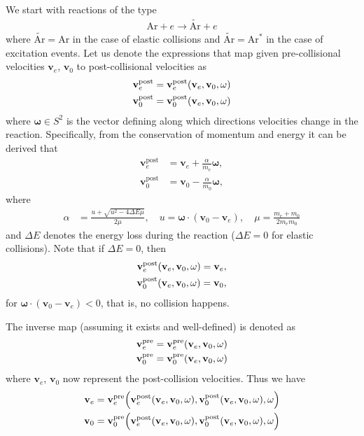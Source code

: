 \documentclass{article}
\newcommand{\vect}[1]{\mathbf{#1}}
\newcommand{\of}[1]{\mleft( #1 \mright)}
\begin{document}
We start with reactions of the type
\begin{align*}
\text{Ar} + e \longrightarrow \tilde{\text{Ar}} + e
\end{align*}
where $\tilde{\text{Ar}} = \text{Ar}$ in the case of elastic collisions and $\tilde{\text{Ar}} = \text{Ar}^\ast$ in the case of excitation events. Let us denote the expressions that map given pre-collisional velocities $\vect{v}_e$, $\vect{v}_0$ to post-collisional velocities as 
\begin{align*}
\vect{v}_e^\text{post} &= \vect{v}_e^\text{post} \of{\vect{v}_e, \vect{v}_0, \vect{\omega}}
\\
\vect{v}_0^\text{post} &= \vect{v}_0^\text{post} \of{\vect{v}_e, \vect{v}_0, \vect{\omega}}
\end{align*} 
where $\vect{\omega} \in S^2$ is the vector defining along which directions velocities change in the reaction. Specifically, from the conservation of momentum and energy it can be derived that
\begin{align*}
\vect{v}_e^\text{post} &= \vect{v}_e + \frac{\alpha}{m_e}\vect{\omega},
\\
\vect{v}_0^\text{post} &= \vect{v}_0 - \frac{\alpha}{m_0}\vect{\omega},
\end{align*}
where
\begin{align*}
\alpha &= \frac{u + \sqrt{u^2 - 4 \Delta E \mu}}{2\mu},
\quad 
u = \vect{\omega} \cdot \left( \vect{v}_0 - \vect{v}_e \right),
\quad 
\mu = \frac{m_e+m_0}{2 m_e m_0}
\end{align*}
and $\Delta E$ denotes the energy loss during the reaction ($\Delta E = 0$ for elastic collisions). Note that if $\Delta E=0$, then
\begin{align*}
\vect{v}_e^\text{post} \of{\vect{v}_e, \vect{v}_0, \vect{\omega}} = \vect{v}_e,
\\
\vect{v}_0^\text{post} \of{\vect{v}_e, \vect{v}_0, \vect{\omega}} = \vect{v}_0,
\end{align*} 
for $\vect{\omega} \cdot \left( \vect{v}_0 - \vect{v}_e \right) < 0$, that is, no collision happens.

The inverse map (assuming it exists and well-defined) is denoted as 
\begin{align*}
\vect{v}_e^\text{pre} &= \vect{v}_e^\text{pre} \of{\vect{v}_e, \vect{v}_0, \vect{\omega}}
\\
\vect{v}_0^\text{pre} &= \vect{v}_0^\text{pre} \of{\vect{v}_e, \vect{v}_0, \vect{\omega}}
\end{align*} 
where $\vect{v}_e$, $\vect{v}_0$ now represent the post-collision velocities. Thus we have 
\begin{align*}
\vect{v}_e &= \vect{v}_e^\text{pre} \of{\vect{v}_e^\text{post} \of{\vect{v}_e, \vect{v}_0, \vect{\omega}}, \vect{v}_0^\text{post} \of{\vect{v}_e, \vect{v}_0, \vect{\omega}}, \vect{\omega}}
\\
\vect{v}_0 &= \vect{v}_0^\text{pre} \of{\vect{v}_e^\text{post} \of{\vect{v}_e, \vect{v}_0, \vect{\omega}}, \vect{v}_0^\text{post} \of{\vect{v}_e, \vect{v}_0, \vect{\omega}}, \vect{\omega}}
\end{align*} 
\end{document}
